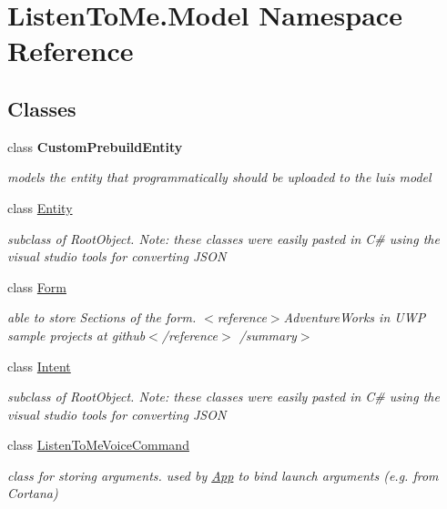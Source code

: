 \hypertarget{namespace_listen_to_me_1_1_model}{}\section{Listen\+To\+Me.\+Model Namespace Reference}
\label{namespace_listen_to_me_1_1_model}
\subsection*{Classes}
\begin{DoxyCompactItemize}
\item 
class {\bfseries Custom\+Prebuild\+Entity}
\begin{DoxyCompactList}\small\item\em models the entity that programmatically should be uploaded to the luis model \end{DoxyCompactList}\item 
class \mbox{\hyperlink{class_listen_to_me_1_1_model_1_1_entity}{Entity}}
\begin{DoxyCompactList}\small\item\em subclass of Root\+Object. Note\+: these classes were easily pasted in C\# using the visual studio tools for converting J\+S\+ON \end{DoxyCompactList}\item 
class \mbox{\hyperlink{class_listen_to_me_1_1_model_1_1_form}{Form}}
\begin{DoxyCompactList}\small\item\em able to store Sections of the form. $<$reference$>$Adventure\+Works in U\+WP sample projects at github$<$/reference$>$ /summary$>$ \end{DoxyCompactList}\item 
class \mbox{\hyperlink{class_listen_to_me_1_1_model_1_1_intent}{Intent}}
\begin{DoxyCompactList}\small\item\em subclass of Root\+Object. Note\+: these classes were easily pasted in C\# using the visual studio tools for converting J\+S\+ON \end{DoxyCompactList}\item 
class \mbox{\hyperlink{class_listen_to_me_1_1_model_1_1_listen_to_me_voice_command}{Listen\+To\+Me\+Voice\+Command}}
\begin{DoxyCompactList}\small\item\em class for storing arguments. used by \mbox{\hyperlink{class_listen_to_me_1_1_app}{App}} to bind launch arguments (e.\+g. from Cortana) \end{DoxyCompactList}\item 

\end{DoxyCompactItemize}

